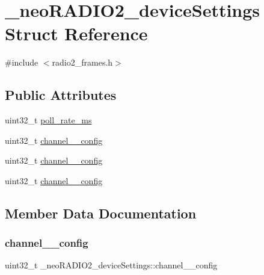 \hypertarget{struct__neo_r_a_d_i_o2__device_settings}{}\section{\+\_\+neo\+R\+A\+D\+I\+O2\+\_\+device\+Settings Struct Reference}
\label{struct__neo_r_a_d_i_o2__device_settings}


{\ttfamily \#include $<$radio2\+\_\+frames.\+h$>$}

\subsection*{Public Attributes}
\begin{DoxyCompactItemize}
\item 
uint32\+\_\+t \mbox{\hyperlink{struct__neo_r_a_d_i_o2__device_settings_a0c942b8a289f27f7bbdfdba853da957e}{poll\+\_\+rate\+\_\+ms}}
\item 
uint32\+\_\+t \mbox{\hyperlink{struct__neo_r_a_d_i_o2__device_settings_ab2c1815bdeb1ad4f3b81fd566bfdb7e9}{channel\+\_\+\_\+config}}
\item 
uint32\+\_\+t \mbox{\hyperlink{struct__neo_r_a_d_i_o2__device_settings_ab3810ad98ff33f4b20b6620c8f45ad36}{channel\+\_\+\_\+config}}
\item 
uint32\+\_\+t \mbox{\hyperlink{struct__neo_r_a_d_i_o2__device_settings_ab5c20c9e87eb8f8deb5b9b2c6ea55a5c}{channel\+\_\+\_\+config}}
\end{DoxyCompactItemize}


\subsection{Member Data Documentation}
\mbox{\label{struct__neo_r_a_d_i_o2__device_settings_ab2c1815bdeb1ad4f3b81fd566bfdb7e9}} 
\subsubsection{\texorpdfstring{channel\+\_\+\_\+config}{channel\_1\_config}}
{\footnotesize\ttfamily uint32\+\_\+t \+\_\+neo\+R\+A\+D\+I\+O2\+\_\+device\+Settings\+::channel\+\_\+\_\+config}


